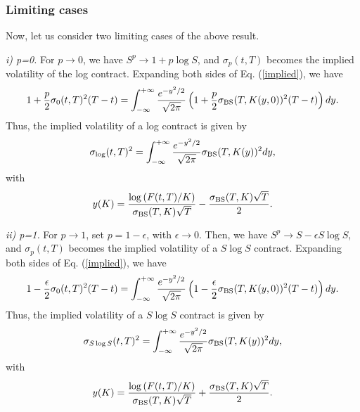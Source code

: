 \documentclass[12pt]{article}
\begin{document}
    \subsubsection{Limiting cases}

      Now, let us consider two limiting cases of the above result.

      {\it i) p=0.} For $p\rightarrow 0$, we have $S^p\rightarrow 1 + p\log S$, and $\sigma_p(t,T)$ becomes the implied volatility of the log contract.
      Expanding both sides of Eq. (\ref{implied}), we have
      \begin{equation}
        1 + \frac{p}{2}\sigma_0(t,T)^2(T-t)
        = \int_{-\infty}^{+\infty}\frac{e^{-y^2/2}}{\sqrt{2\pi}}
          \left(1 + \frac{p}{2}\sigma_{{\rm BS}}(T,K(y,0))^2(T-t)\right)dy.
      \end{equation}
      Thus, the implied volatility of a log contract is given by
      \begin{equation}
        \sigma_{\log}(t,T)^2
        = \int_{-\infty}^{+\infty}\frac{e^{-y^2/2}}{\sqrt{2\pi}}
          \sigma_{{\rm BS}}(T,K(y))^2dy,
      \end{equation}
      with
      \begin{equation}
        y(K)=\frac{\log\left(F(t,T)/K\right)}{\sigma_{{\rm BS}}(T,K)\sqrt{T}}-\frac{\sigma_{{\rm BS}}(T,K)\sqrt{T}}{2}.
      \end{equation}

      {\it ii) p=1.} For $p\rightarrow 1$, set $p=1-\epsilon$, with $\epsilon\rightarrow 0$. Then, we have $S^p\rightarrow S - \epsilon S\log S$,
      and $\sigma_p(t,T)$ becomes the implied volatility of a $S\log S$ contract. Expanding both sides of Eq. (\ref{implied}), we have
      \begin{equation}
        1 - \frac{\epsilon}{2}\sigma_0(t,T)^2(T-t)
        = \int_{-\infty}^{+\infty}\frac{e^{-y^2/2}}{\sqrt{2\pi}}
          \left(1 - \frac{\epsilon}{2}\sigma_{{\rm BS}}(T,K(y,0))^2(T-t)\right)dy.
      \end{equation}
      Thus, the implied volatility of a $S\log S$ contract is given by
      \begin{equation}
        \sigma_{S\log S}(t,T)^2
        = \int_{-\infty}^{+\infty}\frac{e^{-y^2/2}}{\sqrt{2\pi}}
          \sigma_{{\rm BS}}(T,K(y))^2dy,
      \end{equation}
      with
      \begin{equation}
        y(K)=\frac{\log\left(F(t,T)/K\right)}{\sigma_{{\rm BS}}(T,K)\sqrt{T}}+\frac{\sigma_{{\rm BS}}(T,K)\sqrt{T}}{2}.
      \end{equation}
\end{document}
